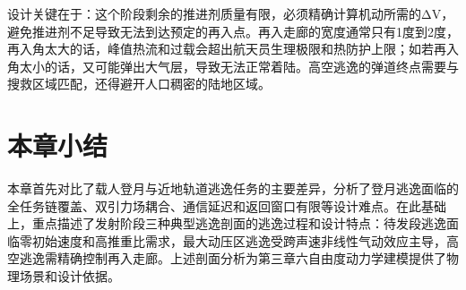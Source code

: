 设计关键在于：这个阶段剩余的推进剂质量有限，必须精确计算机动所需的ΔV，避免推进剂不足导致无法到达预定的再入点。再入走廊的宽度通常只有1度到2度，再入角太大的话，峰值热流和过载会超出航天员生理极限和热防护上限；如若再入角太小的话，又可能弹出大气层，导致无法正常着陆。高空逃逸的弹道终点需要与搜救区域匹配，还得避开人口稠密的陆地区域。


\section{本章小结}

本章首先对比了载人登月与近地轨道逃逸任务的主要差异，分析了登月逃逸面临的全任务链覆盖、双引力场耦合、通信延迟和返回窗口有限等设计难点。在此基础上，重点描述了发射阶段三种典型逃逸剖面的逃逸过程和设计特点：待发段逃逸面临零初始速度和高推重比需求，最大动压区逃逸受跨声速非线性气动效应主导，高空逃逸需精确控制再入走廊。上述剖面分析为第三章六自由度动力学建模提供了物理场景和设计依据。
